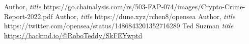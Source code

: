 \documentclass[11pt,oneside,a4paper]{article}
\begin{document}
\begin{thebibliography}{9}
	 Author,
		\textit{title} https://go.chainalysis.com/rs/503-FAP-074/images/Crypto-Crime-Report-2022.pdf
	 Author,
		\textit{title} https://dune.xyz/rchen8/opensea
	 Author,
		\textit{title} https://twitter.com/opensea/status/1486843201352716289
	 Ted Suzman \textit{title} \url{https://hackmd.io/@RoboTeddy/SkFEYwptd}
\end{thebibliography}
\end{document}
